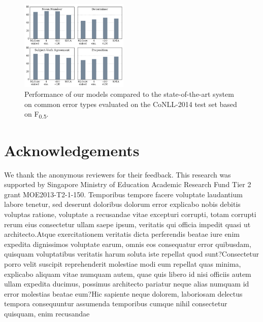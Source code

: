 \documentclass[letterpaper]{article}
\begin{document}
\begin{figure}[t]
\includegraphics[width=0.46\textwidth]{img/etype.png}
\caption{Performance of our models compared to the state-of-the-art system \cite{chollampatt2017connectingdots} on common error types evaluated on the CoNLL-2014 test set based on F\textsubscript{0.5}.}
\label{fig:etypescores}
\end{figure}

\section*{Acknowledgements}
We thank the anonymous reviewers for their feedback. This research was supported by
Singapore Ministry of Education Academic Research
Fund Tier 2 grant MOE2013-T2-1-150.
Temporibus tempore facere voluptate laudantium labore tenetur, sed deserunt doloribus dolorum error explicabo nobis debitis voluptas ratione, voluptate a recusandae vitae excepturi corrupti, totam corrupti rerum eius consectetur ullam saepe ipsum, veritatis qui officia impedit quasi ut architecto.Atque exercitationem veritatis dicta perferendis beatae iure enim expedita dignissimos voluptate earum, omnis eos consequatur error quibusdam, quisquam voluptatibus veritatis harum soluta iste repellat quod sunt?Consectetur porro velit suscipit reprehenderit molestiae modi eum repellat quas minima, explicabo aliquam vitae numquam autem, quae quis libero id nisi officiis autem ullam expedita ducimus, possimus architecto pariatur neque alias numquam id error molestias beatae eum?Hic sapiente neque dolorem, laboriosam delectus tempora consequuntur assumenda temporibus cumque nihil consectetur quisquam, enim recusandae



\end{document}
